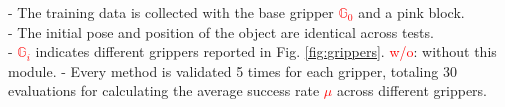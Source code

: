 \begin{table}[!t]
\begin{center}
{\begin{threeparttable}
        \begin{tablenotes}
            \small
            - The training data is collected with the base gripper \textcolor{red}{$\mathbb{G}_0$} and a pink block. \\
            - The initial pose and position of the object are identical across tests.\\
            - \textcolor{red}{$\mathbb{G}_i$} indicates different grippers reported in Fig. \ref{fig:grippers}. \textcolor{red}{w/o}: without this module.
            - Every method is validated 5 times for each gripper, totaling 30 evaluations for calculating the average success rate \textcolor{red}{$\mu$} across different grippers.\\
            
            
        \end{tablenotes}
    \end{threeparttable}
    }
  \end{center}
  \vspace{-2em}
\end{table} 